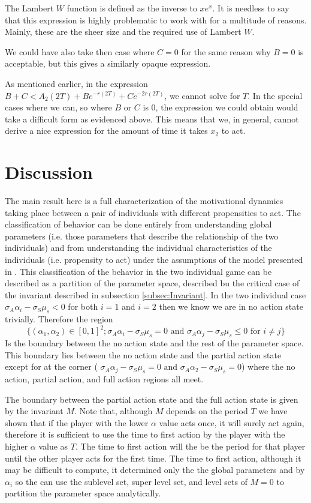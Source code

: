 \documentclass[preprint,12pt]{elsarticle}
\begin{document}
The Lambert $W$ function is defined as the inverse to $xe^x$. It is needless to say that this expression is highly problematic to work with for a multitude of reasons. Mainly, these are the sheer size and the required use of Lambert $W$. 

We could have also take then case where $C = 0$ for the same reason why $B = 0$ is acceptable, but this gives a similarly opaque expression.

As mentioned earlier, in the expression $B +C  < A_2(2T) + Be^{-r(2T)} + Ce^{-2r(2T)}$, we cannot solve for $T$. In the special cases where we can, so where $B$ or $C$ is 0, the expression we could obtain would take a difficult form as evidenced above. This means that we, in general, cannot derive a nice expression for the amount of time it takes $x_2$ to act. 

\section{Discussion}\label{sec:Discussion}
The main result here is a full characterization of the motivational dynamics taking place between a pair of individuals with different propensities to act. The classification of behavior can be done entirely from understanding global parameters (i.e. those parameters that describe the relationship of the two individuals) and from understanding the individual characteristics of the individuals (i.e. propensity to act) under the assumptions of the model presented in \cite{schwarze2024planned}. This classification of the behavior in the two individual game can be described as a partition of the parameter space, described bu the critical case of the invariant described in subsection \ref{subsec:Invariant}.  In the two individual case $\sigma_A\alpha_i-\sigma_S\mu_s<0$ for both $i=1$ and $i=2$ then we know we are in no action state trivially. Therefore the region
\[\{(\alpha_1,\alpha_2)\in [0,1]^2; \sigma_A\alpha_i-\sigma_S\mu_s= 0 \text{ and }\sigma_A\alpha_j-\sigma_S\mu_s\leq 0 \text{ for }i\neq j\}\]
Is the boundary between the no action state and the rest of the parameter space. This boundary lies between the no action state and the partial action state except for at the corner ( $\sigma_A\alpha_j-\sigma_S\mu_s= 0 \text{ and }\sigma_A\alpha_2-\sigma_S\mu_s= 0 $) where the no action, partial action, and full action regions all meet.

The boundary between the partial action state and the full action state is given by the invariant $M$. Note that, although $M$ depends on the period $T$ we have shown that if the player with the lower $\alpha$ value acts once, it will surely act again, therefore it is sufficient to use the time to first action by the player with the higher $\alpha$ value as $T$. The time to first action will the be the period for that player until the other player acts for the first time. The time to first action, although it may be difficult to compute, it determined only the the global parameters and by $\alpha_i$ so the can use the sublevel set, super level set, and level sets of $M=0$ to partition the parameter space analytically.
\end{document}
